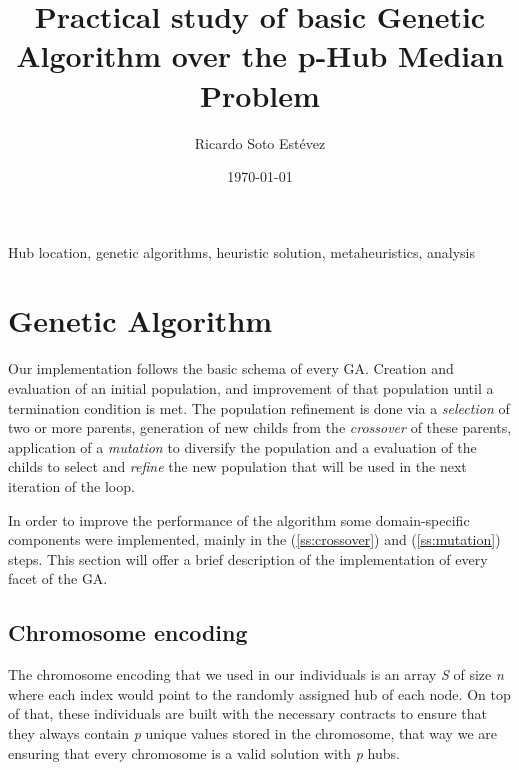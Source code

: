 \documentclass[onecolumn]{IEEEtran}
\author{Ricardo Soto Estévez}
\affil{Menendez Pelayo International University}
\date{\today}
\title{Practical study of basic Genetic Algorithm over the p-Hub Median Problem}
\begin{document}
\maketitle

\begin{abstract}  \end{abstract}

\begin{IEEEkeywords}
Hub location, genetic algorithms, heuristic solution, metaheuristics, analysis 
\end{IEEEkeywords}




\section{Genetic Algorithm}

Our implementation follows the basic schema of every GA\cite{Thede2004}. Creation and evaluation of an initial
population, and improvement of that population until a termination condition is met. The population refinement 
is done via a \emph{selection} of two or more parents, generation of new childs from the \emph{crossover} of
these parents, application of a \emph{mutation} to diversify the population and a evaluation of the childs
to select and \emph{refine} the new population that will be used in the next iteration of the loop.

In order to improve the performance of the algorithm some domain-specific components were implemented,
mainly in the  (\ref{ss:crossover}) 
and  (\ref{ss:mutation}) steps. This 
section will offer a brief description of the implementation of every facet of the GA.

\subsection{Chromosome encoding\label{ss:chromosome}}

The chromosome encoding that we used in our individuals is an array \emph{S} of size \emph{n} where each
index would point to the randomly assigned hub of each node. On top of that, these individuals are built
with the necessary contracts to ensure that they always contain \emph{p} unique values stored in the chromosome,
that way we are ensuring that every chromosome is a valid solution with \emph{p} hubs.
\end{document}
